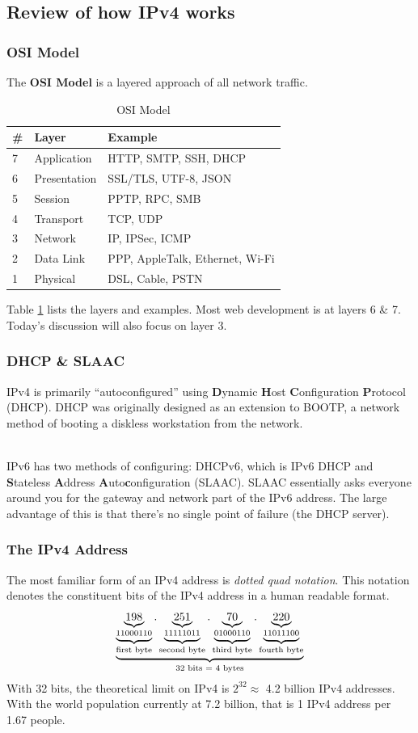 \documentclass[aspectratio=169]{beamer}
\begin{document}
\subsection{Review of how IPv4 works}
\begin{frame}
\frametitle{OSI Model}
The \textbf{OSI Model} is a layered approach of all network traffic.
\begin{table}
\begin{tabular}{|l|l|l|}
\hline
\textbf{\#} & \textbf{Layer} & \textbf{Example}\\
\hline
7 & Application & HTTP, SMTP, SSH, DHCP\\
\hline
6 & Presentation & SSL/TLS, UTF-8, JSON\\
\hline
5 & Session & PPTP, RPC, SMB\\
\hline
4 & Transport & TCP, UDP\\
\hline
3 & Network & IP, IPSec, ICMP\\
\hline
2 & Data Link & PPP, AppleTalk, Ethernet, Wi-Fi\\
\hline
1 & Physical & DSL, Cable, PSTN\\
\hline
\end{tabular}
\caption{OSI Model}
\label{tbl:osi}
\end{table}
Table \ref{tbl:osi} lists the layers and examples. Most web development is at layers 6 \& 7. Today's discussion will also focus on layer 3.
\end{frame}

\begin{frame}
\frametitle{DHCP \& SLAAC}
IPv4 is primarily ``autoconfigured'' using \textbf{D}ynamic \textbf{H}ost \textbf{C}onfiguration \textbf{P}rotocol (DHCP). DHCP was originally designed as an extension to BOOTP, a network method of booting a diskless workstation from the network.

\pause
\mbox{}\\
IPv6 has two methods of configuring: DHCPv6, which is IPv6 DHCP and \textbf{S}tateless \textbf{A}ddress \textbf{A}uto\textbf{c}onfiguration (SLAAC). SLAAC essentially asks everyone around you for the gateway and network part of the IPv6 address. The large advantage of this is that there's no single point of failure (the DHCP server).
\end{frame}

\begin{frame}
\frametitle{The IPv4 Address}
The most familiar form of an IPv4 address is \emph{dotted quad notation}. This notation denotes the constituent bits of the IPv4 address in a human readable format.
\pause
\[
\underbrace{\underbrace{\underbrace{198}_{11000110}}_{\textnormal{first byte}}.\underbrace{\underbrace{251}_{11111011}}_{\textnormal{second byte}}.\underbrace{\underbrace{70}_{01000110}}_{\textnormal{third byte}}.\underbrace{\underbrace{220}_{11011100}}_{\textnormal{fourth byte}}}_{32 \textnormal{ bits } = \textnormal{ } 4 \textnormal{ bytes}}
\]
\pause
With 32 bits, the theoretical limit on IPv4 is $2^{32} \approx $ 4.2 billion IPv4 addresses. With the world population currently at 7.2 billion, that is 1 IPv4 address per 1.67 people. \cite{census}
\end{frame}
\end{document}
